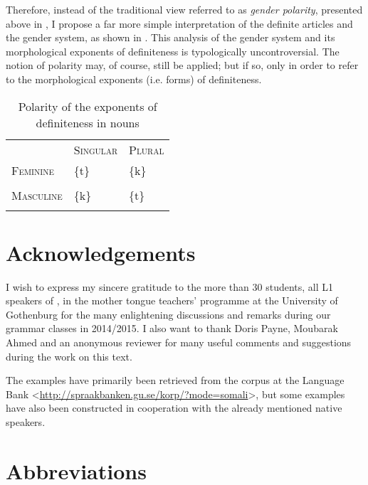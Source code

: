 \documentclass[output=paper]{langsci/langscibook}
\begin{document}
Therefore, instead of the traditional view referred to as \textit{gender polarity}, presented above in , I propose a far more simple interpretation of the definite articles and the gender system, as shown in . This analysis of the  gender system and its morphological exponents of definiteness is typologically uncontroversial. The notion of polarity may, of course, still be applied; but if so, only in order to refer to the morphological exponents (i.e. forms) of definiteness.

\begin{table}
\caption{Polarity of the exponents of definiteness in  nouns}
\label{tab:nilsson:15}

\begin{tabularx}{.5\textwidth}{lXX} & \textsc{Singular}& \textsc{Plural}\\
\lsptoprule
 \textsc{Feminine}& \{t\}& \{k\}\\
\hhline{--~} &  & \\[-.8em]
\hhline{~~-}
 \textsc{Masculine}& \{k\}& \{t\}\\
\lspbottomrule
\end{tabularx}

\end{table} 
 
\section*{Acknowledgements}

I wish to express my sincere gratitude to the more than 30 students, all L1 speakers of , in the  mother tongue teachers’ programme at the University of Gothenburg for the many enlightening discussions and remarks during our grammar classes in 2014/2015. I also want to thank Doris Payne, Moubarak Ahmed and an anonymous reviewer for many useful comments and suggestions during the work on this text.

The  examples have primarily been retrieved from the  corpus at the  Language Bank <\url{http://spraakbanken.gu.se/korp/?mode=somali}>, but some examples have also been constructed in cooperation with the already mentioned native speakers.

\section*{Abbreviations}
\end{document}
